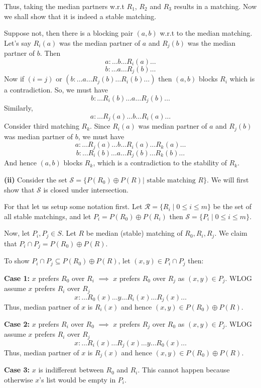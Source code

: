 \documentclass[12pt]{article}
\begin{document}
Thus, taking the median partners w.r.t $R_1$, $R_2$ and $R_3$ results in a matching. Now we shall show that it is indeed a stable matching.

Suppose not, then there is a blocking pair $(a,b)$ w.r.t to the median matching. Let's say $R_i(a)$ was the median partner of $a$ and $R_j(b)$ was the median partner of $b$. Then
$$a: \ldots b \ldots R_i(a) \ldots $$
$$b: \ldots a \ldots R_j(b) \ldots $$
Now if $(i=j)$ or $(b: \ldots a \ldots R_j(b) \ldots R_i(b) \ldots)$ then $(a,b)$ blocks $R_i$ which is a contradiction. So, we must have
$$b: \ldots R_i(b) \ldots a \ldots R_j(b) \ldots $$
Similarly, 
$$a: \ldots R_j(a) \ldots b \ldots R_i(a) \ldots $$
Consider third matching $R_k$. Since $R_i(a)$ was median partner of $a$ and $R_j(b)$ was median partner of $b$, we must have
$$a: \ldots R_j(a) \ldots b \ldots R_i(a) \ldots R_k(a) \ldots $$
$$b: \ldots R_i(b) \ldots a \ldots R_j(b) \ldots R_k(b) \ldots $$
And hence $(a,b)$ blocks $R_k$, which is a contradiction to the stability of $R_k$.
\newline

\textbf{(ii)} Consider the set $\mathscr{S} = \{P(R_0) \oplus P(R) | \text{ stable matching } R\}$. We will first show that $\mathscr{S}$ is closed under intersection.

For that let us setup some notation first. Let $\mathscr{R} = \{R_i \mid  0 \leq i \leq m\}$ be the set of all stable matchings, and let $P_i = P(R_0) \oplus P(R_i)$ then $\mathscr{S} = \{P_i \mid 0 \leq i \leq m\}$. 

Now, let $P_i, P_j \in S$. Let $R$ be median (stable) matching of $R_0, R_i, R_j$. We claim that $P_i \cap P_j = P(R_0) \oplus P(R)$.

To show $P_i \cap P_j \subseteq P(R_0) \oplus P(R)$, let $(x,y) \in P_i \cap P_j$ then:

\textbf{Case 1:} $x$ prefers $R_0$ over $R_i$ $\implies$ $x$ prefers $R_0$ over $R_j$ as $(x,y) \in P_j$. WLOG assume $x$ prefers $R_i$ over $R_j$
$$x: \ldots R_0(x) \ldots y \ldots R_i(x) \ldots R_j(x) \ldots$$
Thus, median partner of $x$ is $R_i(x)$ and hence $(x,y) \in P(R_0) \oplus P(R)$.

\textbf{Case 2:} $x$ prefers $R_i$ over $R_0$ $\implies$ $x$ prefers $R_j$ over $R_0$ as $(x,y) \in P_j$. WLOG assume $x$ prefers $R_i$ over $R_j$
$$x: \ldots R_i(x) \ldots R_j(x) \ldots y \ldots R_0(x) \ldots$$
Thus, median partner of $x$ is $R_j(x)$ and hence $(x,y) \in P(R_0) \oplus P(R)$.

\textbf{Case 3:} $x$ is indifferent between $R_0$ and $R_i$. This cannot happen because otherwise $x$'s list would be empty in $P_i$.
\newline
\end{document}
